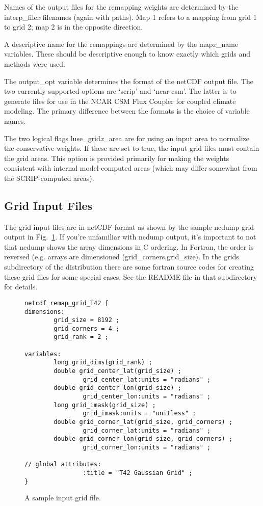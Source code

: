 \documentclass[12pt]{report}
\begin{document}
Names of the output files for the remapping weights are
determined by the interp\_file{\em x} filenames (again
with paths).  Map 1 refers to a mapping from grid 1 to
grid 2; map 2 is in the opposite direction.

A descriptive name for the remappings are determined by
the map{\em x}\_name variables.  These should be
descriptive enough to know exactly which grids and
methods were used.

The output\_opt variable determines the format of the
netCDF output file.  The two currently-supported options
are `scrip' and `ncar-csm'.  The latter is to generate
files for use in the NCAR CSM Flux Coupler for coupled
climate modeling.  The primary difference between the
formats is the choice of variable names.

The two logical flags luse\_grid{\em x}\_area are
for using an input area to normalize the conservative
weights.  If these are set to true, the input grid
files must contain the grid areas.  This option is
provided primarily for making the weights consistent
with internal model-computed areas (which may differ
somewhat from the SCRIP-computed areas).

\subsection{Grid Input Files}

The grid input files are in netCDF format as shown
by the sample ncdump grid output in Fig.~\ref{fig:ncgrid}.
If you're unfamiliar with ncdump output, it's important to
not that ncdump shows the array dimensions in C ordering.
In Fortran, the order is reversed (e.g. arrays are
dimensioned (grid\_corners,grid\_size).
In the grids subdirectory of the distribution there
are some fortran source codes for creating these
grid files for some special cases.  See the README
file in that subdirectory for details.

\begin{figure}
\caption{A sample input grid file. \label{fig:ncgrid}}
\begin{verbatim}
netcdf remap_grid_T42 {
dimensions:
        grid_size = 8192 ;
        grid_corners = 4 ;
        grid_rank = 2 ;

variables:
        long grid_dims(grid_rank) ;
        double grid_center_lat(grid_size) ;
                grid_center_lat:units = "radians" ;
        double grid_center_lon(grid_size) ;
                grid_center_lon:units = "radians" ;
        long grid_imask(grid_size) ;
                grid_imask:units = "unitless" ;
        double grid_corner_lat(grid_size, grid_corners) ;
                grid_corner_lat:units = "radians" ;
        double grid_corner_lon(grid_size, grid_corners) ;
                grid_corner_lon:units = "radians" ;

// global attributes:
                :title = "T42 Gaussian Grid" ;
}
\end{verbatim}
\end{figure}
\end{document}
